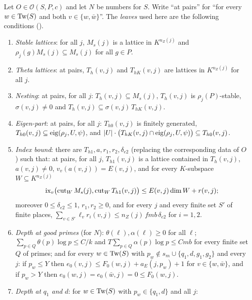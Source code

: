 \begin{definition}[Leaves]\label{pf:onto2:leaves}
Let $O\in\mathcal O(S,P,c)$ and let $N$ be numbers for $S$. Write ``at pairs'' for ``for every $w\in\mathrm{Tw}(S)$ and both
$v\in\{w,\bar w\}$''. The \emph{leaves} used here are the following conditions ().
\begin{enumerate}[label=(L\arabic*)]
\item\label{pf:onto2:L1} \emph{Stable lattices}: for all $j$, $M_s(j)$ is a lattice in $K^{n_Z(j)}$ and $\rho_j(g)M_s(j)\subseteq
  M_s(j)$ for all $g\in P$.
\item\label{pf:onto2:L2} \emph{Theta lattices}: at pairs, $T_h(v,j)$ and $T_{hK}(v,j)$ are lattices in $K^{n_Z(j)}$ for all $j$.
\item\label{pf:onto2:L3} \emph{Nesting}: at pairs, for all $j$: $T_h(v,j)\subseteq M_s(j)$, $T_h(v,j)$ is $\rho_j(P)$-stable,
  $\sigma(v,j)\ne0$ and $T_h(v,j)\subseteq\sigma(v,j)\,T_{hK}(v,j)$.
\item\label{pf:onto2:L4} \emph{Eigen-part}: at pairs, for all $j$: $T_{h0}(v,j)$ is finitely generated,
  $T_{h0}(v,j)\subseteq\operatorname{eig}(\rho_j,U,\psi)$, and $|U|\cdot\bigl(T_{hK}(v,j)\cap\operatorname{eig}(\rho_j,U,\psi)\bigr)\subseteq
  T_{h0}(v,j)$.
\item\label{pf:onto2:L5} \emph{Index bound}: there are $T_{h1},a,r_1,r_2,\delta_{e2}$ (replacing the corresponding data of $O$)
  such that: at pairs, for all $j$, $T_{h1}(v,j)$ is a lattice contained in $T_h(v,j)$, $a(v,j)\ne0$, $v_v(a(v,j))=E(v,j)$, and
  for every $K$-subspace $W\subseteq K^{n_Z(j)}$
  \begin{equation}\label{eq:pf:onto2:LIB}
  \operatorname{ix}_v\bigl(\operatorname{cut}_W M_s(j),\operatorname{cut}_W T_{h1}(v,j)\bigr)\le E(v,j)\dim W+r(v,j);
  \end{equation}
  moreover $0\le\delta_{e2}\le1$, $r_1,r_2\ge0$, and for every $j$ and every finite set $S'$ of finite places,
  $\sum_{v\in S'}\ell_v r_i(v,j)\le n_Z(j)\,fmb\,\delta_{e2}$ for $i=1,2$.
\item\label{pf:onto2:L6} \emph{Depth at good primes} (for $N$): $\theta(\ell),\alpha(\ell)\ge0$ for all $\ell$;
  $\sum_{p\in Q}\theta(p)\log p\le C/k$ and $T\sum_{p\in Q}\alpha(p)\log p\le Cmb$ for every finite set $Q$ of primes; and for
  every $w\in\mathrm{Tw}(S)$ with $p_w\notin s_m\cup\{q_1,d,g_1,g_2\}$ and every $j$: if $p_w\le Y$ then $e_0(v,j)\le
  F_0(w,j)+a_E(j,p_w)+1$ for $v\in\{w,\bar w\}$, and if $p_w>Y$ then $e_0(w,j)=e_0(\bar w,j)=0\le F_0(w,j)$.
\item\label{pf:onto2:L7} \emph{Depth at $q_1$ and $d$}: for $w\in\mathrm{Tw}(S)$ with $p_w\in\{q_1,d\}$ and all $j$:

\end{enumerate}
\end{definition}
